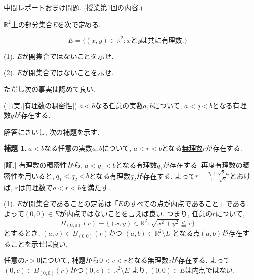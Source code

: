 \documentclass[dvipdfmx,a4paper,11pt]{article}
\newcommand{\R}{\mathbb{R}}
\theoremstyle{definition}
\newtheorem{lem}[thm]{補題}
\begin{document}

 
 \vspace{33pt}
{\Large 中間レポートおまけ問題.} (授業第1回の内容.)
\vspace{11pt}

$\R^2$上の部分集合$E$を次で定める.

$$
E = \{ (x,y) \in \R^2 : \text{$x$と$y$は共に有理数.}\}
$$

(1).
$E$が開集合ではないことを示せ.
 
(2).
$E$が閉集合ではないことを示せ.
    \vspace{11pt}


ただし次の事実は認めて良い.

(事実.[有理数の稠密性])
$a<b$なる任意の実数$a,b$について, $a<q<b$となる有理数$q$が存在する.

  \vspace{11pt}
 
\hspace{-11pt}{\Large $\bullet$ 中間レポートおまけ問題解答例}

解答にさいし, 次の補題を示す.
\begin{lem}
$a<b$なる任意の実数$a,b$について, $a<r<b$となる\underline{無理数$r$}が存在する.
\end{lem}
\hspace{-11pt}[証.]
有理数の稠密性から, $a<q_1<b$となる有理数$q_1$が存在する.
再度有理数の稠密性を用いると, $q_1<q_2<b$となる有理数$q_2$が存在する.
よって$r=\frac{q_1 + \sqrt{2}q_2}{1+\sqrt{2}}$とおけば, $r$は無理数で$a<r<b$を満たす.

(1).
$E$が開集合であることの定義は「$E$のすべての点が内点であること」である.
よって$(0,0) \in E$が内点ではないことを言えば良い.
つまり, 任意の$r$について,
$$
B_{(0,0)}(r) = \{(x,y) \in \R^2 : \sqrt{x^2 + y^2} \leqq r \}
$$
とするとき, $(a,b) \in B_{(0,0)}(r) $かつ
$(a,b) \in \R^2 \setminus E$
となる点$(a,b)$が存在することを示せば良い.

任意の$r>0$について, 
補題から$0 < c < r$となる無理数$c$が存在する.
よって$(0,c) \in B_{(0,0)}(r)$かつ$(0,c) \in \R^2 \setminus E$
より, $(0,0) \in E$は内点ではない.
\end{document}
